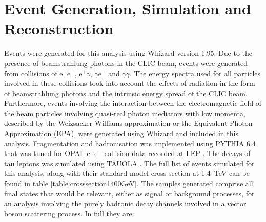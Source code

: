 
\section{Event Generation, Simulation and Reconstruction}
\label{sec:eventgenerationandbackgrounds}
Events were generated for this analysis using Whizard \cite{0708.4233, hep-ph/0102195} version 1.95.  Due to the presence of beamstrahlung photons in the CLIC beam, events were generated from collisions of $\text{e}^{+}\text{e}^{-}$, $\text{e}^{+}\gamma$, $\gamma\text{e}^{-}$ and $\gamma\gamma$.  The energy spectra used for all particles involved in these collisions took into account the effects of radiation in the form of beamstrahlung photons and the intrinsic energy spread of the CLIC beam.  Furthermore, events involving the interaction between the electromagnetic field of the beam particles involving quasi-real photon mediators with low momenta, described by the Weizsacker-Williams approximation or the Equivalent Photon Approximation (EPA), were generated using Whizard and included in this analysis.  Fragmentation and hadronisation was implemented using PYTHIA 6.4 \cite{Sjostrand:2006za} that was tuned for OPAL $\text{e}^{+}\text{e}^{-}$ collision data recorded at LEP \cite{Alexander:1995bk}.  The decays of tau leptons was simulated using TAUOLA \cite{Was:2000st}.  The full list of events simulated for this analysis, along with their standard model cross section at 1.4~TeV can be found in table \ref{table:crosssection1400GeV}.  The samples generated comprise all final states that would be relevant, either as signal or background processes, for an analysis involving the purely hadronic decay channels involved in a vector boson scattering process.  In full they are:

